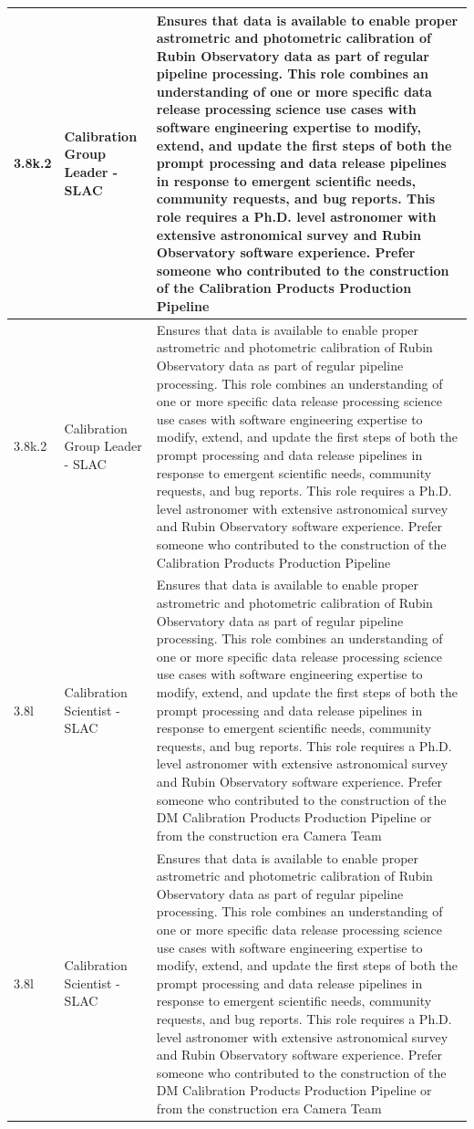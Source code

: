 \begin{longtable} {|p{}|p{}|p{}|}
{3.8k.2}&{Calibration Group Leader - SLAC}&{Ensures that data is available to enable proper astrometric and photometric calibration of Rubin Observatory data as part of regular pipeline processing. This role combines an understanding of one or more specific data release processing science use cases with software engineering expertise to modify, extend, and update the first steps of both the prompt processing and data release pipelines in response to emergent scientific needs, community requests, and bug reports. This role requires a Ph.D. level astronomer with extensive astronomical survey and Rubin Observatory software experience. Prefer someone who contributed to the construction of the Calibration Products Production Pipeline} \\ \hline
{3.8k.2}&{Calibration Group Leader - SLAC}&{Ensures that data is available to enable proper astrometric and photometric calibration of Rubin Observatory data as part of regular pipeline processing. This role combines an understanding of one or more specific data release processing science use cases with software engineering expertise to modify, extend, and update the first steps of both the prompt processing and data release pipelines in response to emergent scientific needs, community requests, and bug reports. This role requires a Ph.D. level astronomer with extensive astronomical survey and Rubin Observatory software experience. Prefer someone who contributed to the construction of the Calibration Products Production Pipeline} \\ \hline
{3.8l}&{Calibration Scientist - SLAC}&{Ensures that data is available to enable proper astrometric and photometric calibration of Rubin Observatory data as part of regular pipeline processing. This role combines an understanding of one or more specific data release processing science use cases with software engineering expertise to modify, extend, and update the first steps of both the prompt processing and data release pipelines in response to emergent scientific needs, community requests, and bug reports. This role requires a Ph.D. level astronomer with extensive astronomical survey and Rubin Observatory software experience. Prefer someone who contributed to the construction of the DM Calibration Products Production Pipeline or from the construction era Camera Team} \\ \hline
{3.8l}&{Calibration Scientist - SLAC}&{Ensures that data is available to enable proper astrometric and photometric calibration of Rubin Observatory data as part of regular pipeline processing. This role combines an understanding of one or more specific data release processing science use cases with software engineering expertise to modify, extend, and update the first steps of both the prompt processing and data release pipelines in response to emergent scientific needs, community requests, and bug reports. This role requires a Ph.D. level astronomer with extensive astronomical survey and Rubin Observatory software experience. Prefer someone who contributed to the construction of the DM Calibration Products Production Pipeline or from the construction era Camera Team} \\ \hline

\end{longtable}
